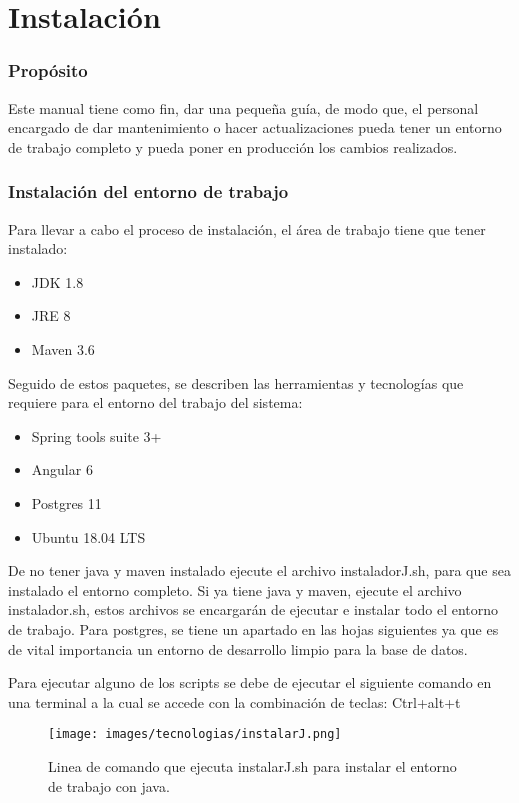 \chapter{Instalación}

\subsection{Propósito}
Este manual tiene como fin, dar una pequeña guía, de modo que, el personal encargado de dar mantenimiento o hacer actualizaciones pueda tener un entorno de trabajo completo y pueda poner en producción los cambios realizados.

\subsection{Instalación del entorno de trabajo}
Para llevar a cabo el proceso de instalación, el área de trabajo tiene que tener instalado:
\begin{itemize}
  \item JDK 1.8
  \item JRE 8
  \item Maven 3.6
\end{itemize}

Seguido de estos paquetes, se describen las herramientas y tecnologías que requiere para el entorno del trabajo del sistema:
\begin{itemize}
  \item Spring tools suite 3+
  \item Angular 6
  \item Postgres 11
  \item Ubuntu 18.04 LTS
\end{itemize}
De no tener java y maven instalado ejecute el archivo instaladorJ.sh, para que sea instalado el entorno completo.
Si ya tiene java y maven, ejecute el archivo instalador.sh, estos archivos se encargarán de ejecutar e instalar todo el entorno de trabajo.
Para postgres, se tiene un apartado en las hojas siguientes ya que es de vital importancia un entorno de desarrollo limpio para la base de datos.

Para ejecutar alguno de los scripts se debe de ejecutar el siguiente comando en una terminal a la cual se accede con la combinación de teclas: Ctrl+alt+t

\begin{figure}[H]
  \centering
  \texttt{[image: images/tecnologias/instalarJ.png]}
  \caption{Linea de comando que ejecuta instalarJ.sh para instalar el entorno de trabajo con java.}
\end{figure}

